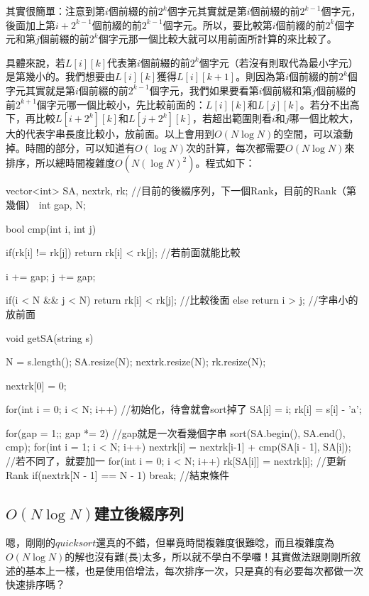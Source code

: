 			其實很簡單：注意到第$i$個前綴的前$2^{k}$個字元其實就是第$i$個前綴的前$2^{k - 1}$個字元，後面加上第$i + 2^{k - 1}$個前綴的前$2^{k - 1}$個字元。所以，要比較第$i$個前綴的前$2^{k}$個字元和第$j$個前綴的前$2^{k}$個字元那一個比較大就可以用前面所計算的來比較了。
			
			
			具體來說，若$L[i][k]$代表第$i$個前綴的前$2^{k}
			$個字元（若沒有則取代為最小字元）是第幾小的。我們想要由$L[i][k]$獲得$L[i][k + 1]$。則因為第$i$個前綴的前$2^{k}$個字元其實就是第$i$個前綴的前$2^{k - 1}$個字元，我們如果要看第$i$個前綴和第$j$個前綴的前$2^{k + 1}$個字元哪一個比較小，先比較前面的：$L[i][k]$和$L[j][k]$。若分不出高下，再比較$L[i + 2^{k}][k]$和$L[j + 2^{k}][k]$，若超出範圍則看$i$和$j$哪一個比較大，大的代表字串長度比較小，放前面。以上會用到$O(N \log N)$的空間，可以滾動掉。時間的部分，可以知道有$O(\log N)$次的計算，每次都需要$O(N \log N)$來排序，所以總時間複雜度$O(N (\log N)^2)$。程式如下：
			\begin{C++}
vector<int> SA, nextrk, rk; //目前的後綴序列，下一個Rank，目前的Rank（第幾個）
int gap, N;

bool cmp(int i, int j){
	if(rk[i] != rk[j]) 
		return rk[i] < rk[j]; //若前面就能比較
	
	i += gap;
	j += gap;
	
	if(i < N && j < N) 
		return rk[i] < rk[j]; //比較後面
	else 
		return i > j; //字串小的放前面
}

void getSA(string s){
	N = s.length();
	SA.resize(N);
	nextrk.resize(N);
	rk.resize(N);
	
	nextrk[0] = 0;
	
	for(int i = 0; i < N; i++){ //初始化，待會就會sort掉了
		SA[i] = i;
		rk[i] = s[i] - 'a';
	}
	
	for(gap = 1;; gap *= 2){ //gap就是一次看幾個字串
		sort(SA.begin(), SA.end(), cmp);
		for(int i = 1; i < N; i++) 
			nextrk[i] = nextrk[i-1] + cmp(SA[i - 1], SA[i]); //若不同了，就要加一
		for(int i = 0; i < N; i++) 
			rk[SA[i]] = nextrk[i]; //更新Rank
		if(nextrk[N - 1] == N - 1) break; //結束條件
	}
}
			\end{C++}		
		\subsection{$O(N \log N)$建立後綴序列}
		嗯，剛剛的$quick sort$還真的不錯，但畢竟時間複雜度很難唸，而且複雜度為$O(N \log N)$的解也沒有難(長)太多，所以就不學白不學囉！其實做法跟剛剛所敘述的基本上一樣，也是使用倍增法，每次排序一次，只是真的有必要每次都做一次快速排序嗎？
		
